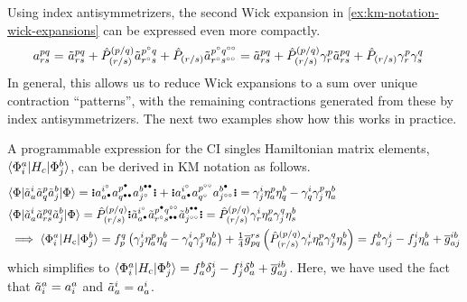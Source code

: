 \documentclass[11pt]{article}
\numberwithin{equation}{section}
\begin{document}
\begin{ex}
Using index antisymmetrizers, the second Wick expansion in \cref{ex:km-notation-wick-expansions} can be expressed even more compactly.
\begin{align*}
  a^{pq}_{rs}
=&\
  \tilde{a}^{pq}_{rs}
+
  \hat{P}^{(p/q)}_{(r/s)}
  \tilde{a}^{p^\circ q}_{r^\circ s}
+
  \hat{P}_{(r/s)}
  \tilde{a}^{p^\circ q^{\circ\circ}}_{r^\circ s^{\circ\circ}}
=
  \tilde{a}^{pq}_{rs}
+
  \hat{P}^{(p/q)}_{(r/s)}
  \gamma ^p_r
  \tilde{a}^{pq}_{rs}
+
  \hat{P}_{(r/s)}
  \gamma ^p_r
  \gamma ^q_s
\end{align*}
In general, this allows us to reduce Wick expansions to a sum over unique contraction ``patterns'', with the remaining contractions generated from these by index antisymmetrizers.
The next two examples show how this works in practice.
\end{ex}



\begin{ex}
A programmable expression for the CI singles Hamiltonian matrix elements, $\langle\Phi _i^a|H_c|\Phi _j^b\rangle$,  can be derived in KM notation as follows.
\begin{align*}
&
  \ip{\F|\tl{a}_a^i\tl{a}_q^p\tl{a}_j^b|\F}
=
  \gno{
    a_{a^\ptcl}^{i^\hole}
    a_{q^{\ptcl\ptcl}}^{p^\ptcl}
    a_{j^\hole}^{b^{\ptcl\ptcl}}
  }
+
  \gno{
    a_{a^\ptcl}^{i^{\hole}}
    a_{q^{\hole}}^{p^{\hole\hole}}
    a_{j^{\hole\hole}}^{b^{\ptcl}}
  }
=
  \g^i_j\h_a^p\h_q^b
-
  \g_q^i\g_j^p\h_a^b
\\
&
  \ip{\F|\tl{a}_a^i\tl{a}^{pq}_{rs}\tl{a}_j^b|\F}
=
  \op{P}^{(p/q)}_{(r/s)}
  \gno{
    \tl{a}^{i^\hole}_{a^\ptcl}
    \tl{a}^{p^\ptcl q^{\hole\hole}}_{r^\hole s^{\ptcl\ptcl}}
    \tl{a}^{b^{\ptcl\ptcl}}_{j^{\hole\hole}}
  }
=
  \op{P}^{(p/q)}_{(r/s)}
  \g^i_r\h^p_a\g^q_j\h^b_s
\\
&
\implies
  \ip{\F_i^a|H_\mr{c}|\F_j^b}
=
  f_p^q\pr{
    \g^i_j\h_a^p\h_q^b
  -
    \g_q^i\g_j^p\h_a^b
  }
+
  \tfr{1}{4}
  \ol{g}_{pq}^{rs}\pr{
    \op{P}^{(p/q)}_{(r/s)}
    \g^i_r\h^p_a\g^q_j\h^b_s
  }
=
  f_a^b\g_j^i
-
  f_j^i\h_a^b
+
  \ol{g}^{ib}_{aj}
\end{align*}
which simplifies to
$\langle\Phi _i^a|H_{\mathrm{c}}|\Phi _j^b\rangle=f_a^b\delta _j^i-f_j^i\delta _a^b+\overline{g}^{ib}_{aj}$.
Here, we have used the fact that $\tilde{a}_i^a=a_i^a$ and $\tilde{a}_a^i=a_a^i$.
\end{ex}
\end{document}
